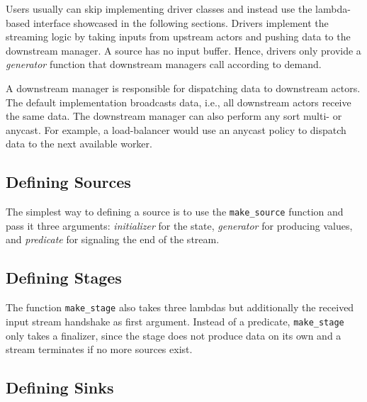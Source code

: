 
Users usually can skip implementing driver classes and instead use the
lambda-based interface showcased in the following sections. Drivers implement
the streaming logic by taking inputs from upstream actors and pushing data to
the downstream manager. A source has no input buffer. Hence, drivers only
provide a \emph{generator} function that downstream managers call according to
demand.

A downstream manager is responsible for dispatching data to downstream actors.
The default implementation broadcasts data, i.e., all downstream actors receive
the same data. The downstream manager can also perform any sort multi- or
anycast. For example, a load-balancer would use an anycast policy to dispatch
data to the next available worker.

\clearpage

\subsection{Defining Sources}


The simplest way to defining a source is to use the \lstinline^make_source^
function and pass it three arguments: \emph{initializer} for the state,
\emph{generator} for producing values, and \emph{predicate} for signaling the
end of the stream.

\clearpage

\subsection{Defining Stages}


The function \lstinline^make_stage^ also takes three lambdas but additionally
the received input stream handshake as first argument. Instead of a predicate,
\lstinline^make_stage^ only takes a finalizer, since the stage does not produce
data on its own and a stream terminates if no more sources exist.

\clearpage

\subsection{Defining Sinks}


